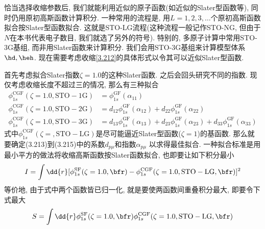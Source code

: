 恰当选择收缩参数后, 
我们就能利用近似的原子\hft 函数(如近似的Slater型函数等), 
同时仍用原初高斯函数计算积分. 
一种常用的流程是, 
用$L=1,2,3,\ldots$个原初高斯函数拟合按Slater型函数拟合. 
这就是STO-LG流程(这种流程一般记作STO-NG, 
但由于$N$在本书代表电子数目, 
我们就选了另外的符号). 
特别的, 
多原子计算中常用STO-3G基组, 
而非用Slater函数来计算积分. 
我们会用STO-3G基组来计算模型体系$\hd,\heh$. 
现在需要考虑收缩\autoref{3.212}的具体形式以令其可以近似Slater型函数.


首先考虑拟合Slater指数$\zeta=1.0$的这种Slater函数. 
之后会回头研究不同的指数. 
现仅考虑收缩长度不超过三的情况, 
那么有三种拟合
\begin{align}
	\phi_{1s}^\mathrm{CGF}(\zeta=1.0, \mathrm{STO-1G}) &= \phi_{1s}^\mathrm{GF}(\alpha_{11})\\
	\phi_{1s}^\mathrm{CGF}(\zeta=1.0, \mathrm{STO-2G}) &= d_{12}\phi_{1s}^\mathrm{GF}(\alpha_{12}) + d_{22}\phi_{1s}^\mathrm{GF}(\alpha_{22})\\
	\phi_{1s}^\mathrm{CGF}(\zeta=1.0, \mathrm{STO-3G}) &= d_{13}\phi_{1s}^\mathrm{GF}(\alpha_{13}) + d_{23}\phi_{1s}^\mathrm{GF}(\alpha_{23}) + d_{33}\phi_{1s}^\mathrm{GF}(\alpha_{33})
\end{align}
式中$\phi_{1s}^\mathrm{CGF}(\zeta=, \mathrm{STO-LG})$是尽可能逼近Slater型函数($\zeta=1$)的基函数. 
那么就要确定(3.213)到(3.215)中的系数$d_{p\mu}$和指数$\alpha_{p\mu}$
以求得最佳拟合. 
一种拟合标准是用最小平方的做法将收缩高斯函数按Slater函数拟合,
也即要让如下积分最小
\begin{align}
	I = \int\dd{r}[\phi_{1s}^\mathrm{SF}(\zeta=1.0,\bfr) - \phi_{1s}^\mathrm{CGF}(\zeta=1.0, \mathrm{STO-LG},\bfr)]^2
\end{align}
等价地, 
由于式中两个函数皆已归一化, 
就是要使两函数间重叠积分最大, 
即要令下式最大
\begin{align}
	S = \int\dd{r}\phi_{1s}^\mathrm{SF}(\zeta=1.0,\bfr)\phi_{1s}^\mathrm{CGF}(\zeta=1.0, \mathrm{STO-LG},\bfr)
\end{align}


